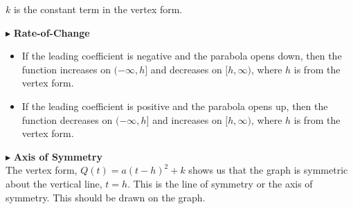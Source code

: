 \documentclass{ximera}
\begin{document}
$k$ is the constant term in the vertex form.




$\blacktriangleright$ \textbf{\textcolor{red!10!blue!90!}{Rate-of-Change}} \\
\begin{itemize}
\item If the leading coefficient is negative and the parabola opens down, then the function increases on $(-\infty, h]$ and decreases on $[h, \infty)$, where $h$ is from the vertex form.
\item If the leading coefficient is positive and the parabola opens up, then the function decreases on $(-\infty, h]$ and increases on $[h, \infty)$, where $h$ is from the vertex form.
\end{itemize}





$\blacktriangleright$ \textbf{\textcolor{red!10!blue!90!}{Axis of Symmetry}} \\ 
The vertex form, $Q(t) = a(t-h)^2 + k$ shows us that the graph is symmetric about the vertical line, $t=h$.  This is the line of symmetry or the axis of symmetry.  This should be drawn on the graph.
\end{document}
